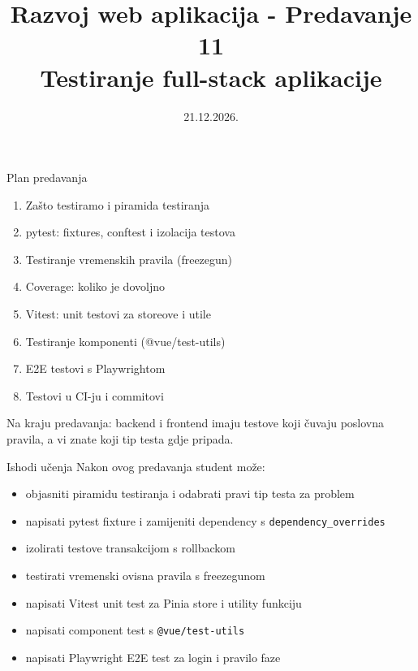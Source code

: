 

\title[Razvoj web aplikacija]{Razvoj web aplikacija - Predavanje 11 \\ Testiranje full-stack aplikacije}
\date{21.12.2026.}



\frame{\titlepage}

\begin{frame}{Plan predavanja}
\begin{enumerate}
  \item Zašto testiramo i piramida testiranja
  \item pytest: fixtures, conftest i izolacija testova
  \item Testiranje vremenskih pravila (freezegun)
  \item Coverage: koliko je dovoljno
  \item Vitest: unit testovi za storeove i utile
  \item Testiranje komponenti (@vue/test-utils)
  \item E2E testovi s Playwrightom
  \item Testovi u CI-ju i commitovi
\end{enumerate}

\vspace{0.6em}
Na kraju predavanja: backend i frontend imaju testove koji čuvaju poslovna pravila, a vi znate koji tip testa gdje pripada.
\end{frame}

\begin{frame}{Ishodi učenja}
Nakon ovog predavanja student može:
\begin{itemize}
  \item objasniti piramidu testiranja i odabrati pravi tip testa za problem
  \item napisati pytest fixture i zamijeniti dependency s \texttt{dependency\_overrides}
  \item izolirati testove transakcijom s rollbackom
  \item testirati vremenski ovisna pravila s freezegunom
  \item napisati Vitest unit test za Pinia store i utility funkciju
  \item napisati component test s \texttt{@vue/test-utils}
  \item napisati Playwright E2E test za login i pravilo faze
\end{itemize}
\end{frame}

